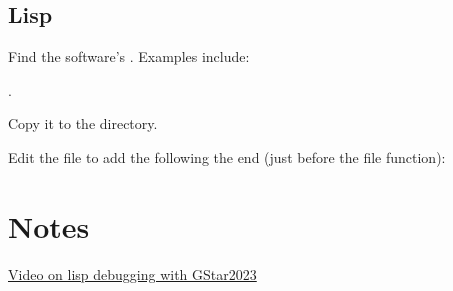 \documentclass{lebook}
\newcommand*{\supportdir}{\textcode{\textit{support}}}
\begin{document}
\section{Lisp}
\begin{numberedlist}
    \item Find the software's .  Examples include:
    \begin{bulletedlist}
    	\item {}
    	\item {}.
    \end{bulletedlist}
    \item Copy it to the \supportdir{} directory.
    \item Edit the file to add the following the end (just before the file  function):
    \begin{plainlist}
    	\item {}
		\item {}
    \end{plainlist}

\end{numberedlist}




\chapter{Notes}
\begin{bulletedlist}
	\item \href{https://www.youtube.com/watch?v=Rrgx3TcXNzM}{Video on lisp debugging with GStar2023}
\end{bulletedlist}
\end{document}
